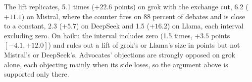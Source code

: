 The lift replicates, 5.1 times ($+22.6$ points) on grok with the exchange
cut, 6.2 ($+11.1$) on Mistral,
 where the counter fires on 88 percent of
debates and is close to a constant, 2.3 ($+5.7$) on DeepSeek and 1.5
($+16.2$) on Llama, each interval excluding zero. On haiku the interval
includes zero (1.5 times, $+3.5$ points $[-4.1, +12.0]$) and rules out a
lift of grok's or Llama's size in points but not Mistral's or DeepSeek's.
Advocates' objections are strongly opposed on grok alone, each objecting
mainly when its side loses, so the argument above is supported only there.
